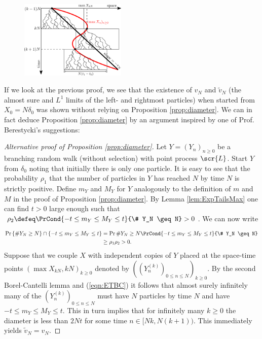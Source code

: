 \begin{figure}
\centering
\includegraphics[width=0.45\textwidth]{graphics/g1.png}
\end{figure}

If we look at the previous proof, we see that the existence of $v_N$ and $\tilde{v}_N$ (the almost sure and $L^1$ limits of the left- and rightmost particles) when started from $X_0 = N \delta_0$ was shown without relying on Proposition \ref{prop:diameter}. We can in fact deduce Proposition \ref{prop:diameter} by an argument inspired by one of Prof. Berestycki's suggestions:

\begin{proof}[Alternative proof of Proposition \ref{prop:diameter}]
Let $Y = (Y_n)_{n \geq 0}$ be a branching random walk (without selection) with point process $\scr{L}$. Start $Y$ from $\delta_{0}$ noting that initially there is only one particle. It is easy to see that the probability $\rho_1$ that the number of particles in $Y$ has reached $N$ by time $N$ is strictly positive. Define $m_Y$ and $M_Y$ for $Y$ analogously to the definition of $m$ and $M$ in the proof of Proposition \ref{prop:diameter}. By Lemma \ref{lem:ExpTailsMax} one can find $t > 0$ large enough such that $\rho_2 \defeq \PrCond{-t \leq m_Y \leq M_Y \leq t }{\# Y_N \geq N} > 0$. We can now write

\begin{align}\label{eqn:ETBC}
\Pr{\{ \# Y_N \geq N \} \cap \{-t \leq m_Y \leq M_Y \leq t \}} &= \Pr{\# Y_N \geq N} \PrCond{-t \leq m_Y \leq M_Y \leq t }{\# Y_N \geq N} \\
															   &\geq \rho_1 \rho_2 > 0. 
\end{align}
Suppose that we couple $X$ with independent copies of $Y$  placed at the space-time points $(\max X_{kN}, kN)_{k \geq 0}$ denoted by $((Y^{(k)}_n)_{0 \leq n \leq N})_{k \geq 0}$. By the second Borel-Cantelli lemma and (\ref{eqn:ETBC}) it follows that almost surely infinitely many of the $(Y^{(k)}_n)_{0 \leq n \leq N}$ must have $N$ particles by time $N$ and have $-t \leq m_Y \leq M_Y \leq t $. This in turn implies that for infinitely many $k \geq 0$ the diameter is less than $2Nt$ for some time $n \in [Nk, N(k+1))$. This immediately yields $\tilde{v}_N = v_N$. 
\end{proof}

